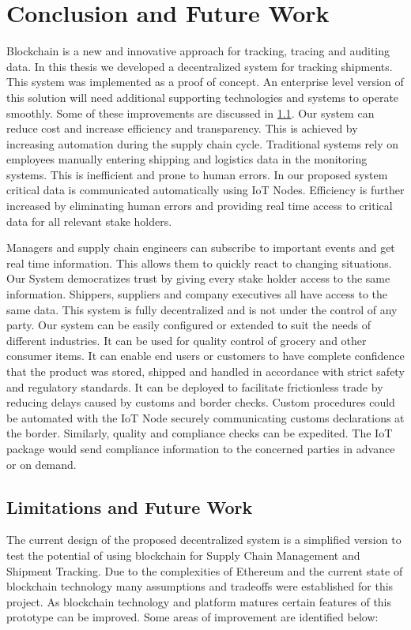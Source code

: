 \section{Conclusion and Future Work}
Blockchain is a new and innovative approach for tracking, tracing and auditing data. In this thesis we developed a decentralized system for tracking shipments. This system was implemented as a proof of concept. An enterprise level version of this solution will need additional supporting technologies and systems to operate smoothly. Some of these improvements are discussed in \ref{improve}. Our system can reduce cost and increase efficiency and transparency. This is achieved by increasing automation during the supply chain cycle. Traditional systems rely on employees manually entering shipping and logistics data in the monitoring systems. This is inefficient and prone to human errors. In our proposed system critical data is communicated automatically using IoT Nodes. Efficiency is further increased by eliminating human errors and providing real time access to critical data for all relevant stake holders.

Managers and supply chain engineers can subscribe to important events and get real time information. This allows them to quickly react to changing situations. Our System democratizes trust by giving every stake holder access to the same information. Shippers, suppliers and company executives all have access to the same data. This system is fully decentralized and is not under the control of any party. Our system can be easily configured or extended to suit the needs of different industries. It can be used for quality control of grocery and other consumer items. It can enable end users or customers to have complete confidence that the product was stored, shipped and handled in accordance with strict safety and regulatory standards. It can be deployed to facilitate frictionless trade by reducing delays caused by customs and border checks. Custom procedures could be automated with the IoT Node securely communicating customs declarations at the border. Similarly, quality and compliance checks can be expedited. The IoT package would send compliance information to the concerned parties in advance or on demand.

\subsection{Limitations and Future Work} \label{improve} 
The current design of the proposed decentralized system is a simplified version to test the potential of using blockchain for Supply Chain Management and Shipment Tracking. Due to the complexities of Ethereum and the current state of blockchain technology many assumptions and tradeoffs were established for this project. As blockchain technology and platform matures certain features of this prototype can be improved. Some areas of improvement are identified below:

